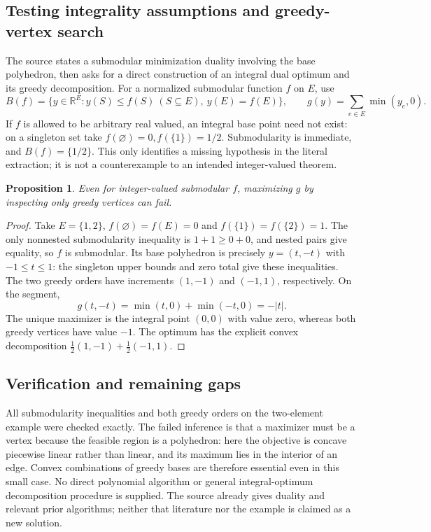 \documentclass[11pt]{article}
\newtheorem{proposition}{Proposition}
\begin{document}
\subsection{Testing integrality assumptions and greedy-vertex search}
The source states a submodular minimization duality involving the base polyhedron, then asks for a direct construction of an integral dual optimum and its greedy decomposition. For a normalized submodular function $f$ on $E$, use
\[
B(f)=\{y\in\mathbb R^E:y(S)\le f(S)\ (S\subseteq E),\ y(E)=f(E)\},
\qquad g(y)=\sum_{e\in E}\min(y_e,0).
\]
If $f$ is allowed to be arbitrary real valued, an integral base point need not exist: on a singleton set take $f(\varnothing)=0,f(\{1\})=1/2$. Submodularity is immediate, and $B(f)=\{1/2\}$. This only identifies a missing hypothesis in the literal extraction; it is not a counterexample to an intended integer-valued theorem.
\begin{proposition}
Even for integer-valued submodular $f$, maximizing $g$ by inspecting only greedy vertices can fail.
\end{proposition}
\begin{proof}
Take $E=\{1,2\}$, $f(\varnothing)=f(E)=0$ and $f(\{1\})=f(\{2\})=1$. The only nonnested submodularity inequality is $1+1\ge0+0$, and nested pairs give equality, so $f$ is submodular. Its base polyhedron is precisely $y=(t,-t)$ with $-1\le t\le1$: the singleton upper bounds and zero total give these inequalities. The two greedy orders have increments $(1,-1)$ and $(-1,1)$, respectively. On the segment,
\[
g(t,-t)=\min(t,0)+\min(-t,0)=-|t|.
\]
The unique maximizer is the integral point $(0,0)$ with value zero, whereas both greedy vertices have value $-1$. The optimum has the explicit convex decomposition $\frac12(1,-1)+\frac12(-1,1)$.
\end{proof}
\subsection{Verification and remaining gaps}
All submodularity inequalities and both greedy orders on the two-element example were checked exactly. The failed inference is that a maximizer must be a vertex because the feasible region is a polyhedron: here the objective is concave piecewise linear rather than linear, and its maximum lies in the interior of an edge. Convex combinations of greedy bases are therefore essential even in this small case. No direct polynomial algorithm or general integral-optimum decomposition procedure is supplied. The source already gives duality and relevant prior algorithms; neither that literature nor the example is claimed as a new solution.
\end{document}
